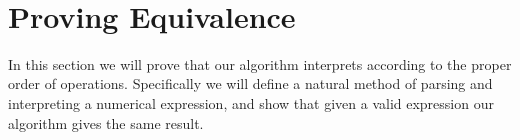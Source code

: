 \bigskip
\hbox{
}

\vfill\break

\section{Proving Equivalence}

In this section we will prove that our algorithm interprets according to the proper order of operations.
Specifically we will define a natural method of parsing and interpreting a numerical expression, and show that given a valid expression our algorithm gives the same result.

